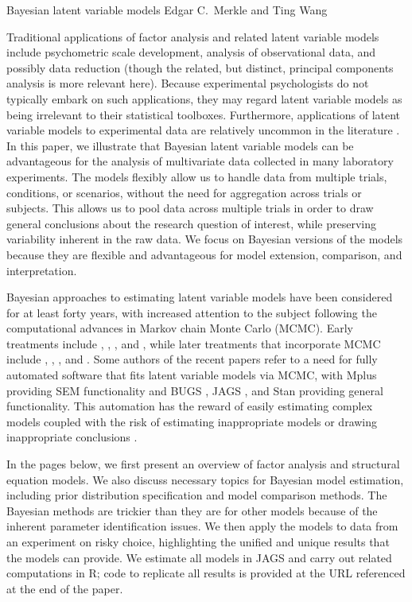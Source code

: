 {Bayesian latent variable models}
{Edgar C.\ Merkle and Ting Wang}


\let\proglang=\textsf
\let\pkg=\emph
\let\code=\texttt

Traditional applications of factor analysis and related latent variable models include psychometric scale development, analysis of observational data, and possibly data reduction (though the related, but distinct, principal components analysis is more relevant here).  Because experimental psychologists do not typically embark on such applications, they may regard latent variable models as being irrelevant to their statistical toolboxes.  Furthermore, applications of latent variable models to experimental data are relatively uncommon in the literature \cite<though see>{bagyi89,don03,miy00,ruskah98,wicdol05}. In this paper, we illustrate  that Bayesian latent variable models can be advantageous for the analysis of multivariate data collected in many laboratory experiments.  The models flexibly allow us to handle data from multiple trials, conditions, or scenarios, without the need for aggregation across trials or subjects.  This allows us to pool data across multiple trials in order to draw general conclusions about the research question of interest, while preserving variability inherent in the raw data. We focus on Bayesian versions of the models because they are flexible and advantageous for model extension, comparison, and interpretation.

Bayesian approaches to estimating latent variable models have been considered for at least forty years, with increased attention to the subject following the computational advances in Markov chain Monte Carlo (MCMC).  Early treatments include , , , and , while later treatments that incorporate MCMC include , , , and .  Some authors of the recent papers refer to a need for fully automated software that fits latent variable models via MCMC, with \proglang{Mplus} \cite{mplus} providing SEM functionality and \proglang{BUGS} \cite{bugs12}, \proglang{JAGS} \cite{plu03}, and \proglang{Stan} \cite{stan14} providing general functionality.  This automation has the reward of easily estimating complex models coupled with the risk of estimating inappropriate models or drawing inappropriate conclusions \cite<also see>{macedw12,ste01,strmil14}.

In the pages below, we first present an overview of factor analysis and structural equation models.  We also discuss necessary topics for Bayesian model estimation, including prior distribution specification and model comparison methods. The Bayesian methods are trickier than they are for other models because of the inherent parameter identification issues.  We then apply the models to data from an experiment on risky choice, highlighting the unified and unique results that the models can provide.  We estimate all models in \proglang{JAGS} and carry out related computations in \proglang{R}; code to replicate all results is provided at the URL referenced at the end of the paper.


